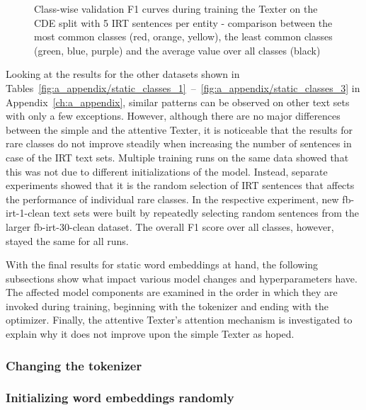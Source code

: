 \begin{figure}[t]
    \centering
    
    \caption{Class-wise validation F1 curves during training the Texter on the CDE split with 5 IRT sentences per entity - comparison between the most common classes (red, orange, yellow), the least common classes (green, blue, purple) and the average value over all classes (black)}
    \label{fig:5_experiments/4_texter/2_static/plot_class_curves}
\end{figure}

Looking at the results for the other datasets shown in Tables~\ref{fig:a_appendix/static_classes_1}~--~\ref{fig:a_appendix/static_classes_3} in Appendix~\ref{ch:a_appendix}, similar patterns can be observed on other text sets with only a few exceptions. However, although there are no major differences between the simple and the attentive Texter, it is noticeable that the results for rare classes do not improve steadily when increasing the number of sentences in case of the IRT text sets. Multiple training runs on the same data showed that this was not due to different initializations of the model. Instead, separate experiments showed that it is the random selection of IRT sentences that affects the performance of individual rare classes. In the respective experiment, new fb-irt-1-clean text sets were built by repeatedly selecting random sentences from the larger fb-irt-30-clean dataset. The overall F1 score over all classes, however, stayed the same for all runs.

With the final results for static word embeddings at hand, the following subsections show what impact various model changes and hyperparameters have. The affected model components are examined in the order in which they are invoked during training, beginning with the tokenizer and ending with the optimizer. Finally, the attentive Texter's attention mechanism is investigated to explain why it does not improve upon the simple Texter as hoped.

\subsubsection{Changing the tokenizer}
\label{subsubsec:5_experiments/4_texter/2_static/1_tokenizer}


\subsubsection{Initializing word embeddings randomly}
\label{subsubsec:5_experiments/4_texter/2_static/2_emb_size}


